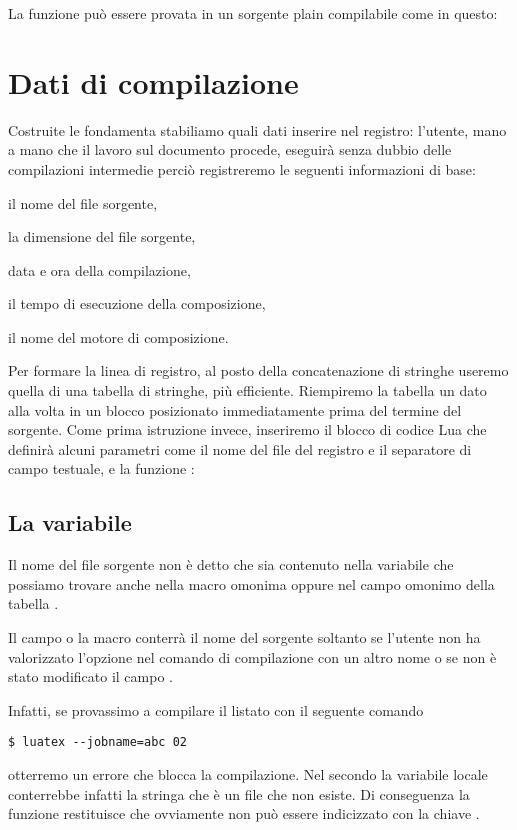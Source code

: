 La funzione  può essere provata in un sorgente plain \LuaTeX{}
compilabile come in questo:


\section{Dati di compilazione}

Costruite le fondamenta stabiliamo quali dati inserire nel registro: l'utente,
mano a mano che il lavoro sul documento procede, eseguirà senza dubbio delle
compilazioni intermedie perciò registreremo le seguenti informazioni di base:
\begin{compactenumerate}
\item il nome del file sorgente,
\item la dimensione del file sorgente,
\item data e ora della compilazione,
\item il tempo di esecuzione della composizione,
\item il nome del motore di composizione.
\end{compactenumerate}

Per formare la linea di registro, al posto della concatenazione di stringhe
useremo quella di una tabella di stringhe, più efficiente. Riempiremo la tabella
un dato alla volta in un blocco  posizionato immediatamente prima
del termine del sorgente. Come prima istruzione invece, inseriremo il blocco di
codice Lua che definirà alcuni parametri come il nome del file del registro e il
separatore di campo testuale, e la funzione :


\subsection{La variabile }

Il nome del file sorgente non è detto che sia contenuto nella variabile
 che possiamo trovare anche nella macro omonima oppure nel campo
omonimo della tabella .

Il campo o la macro conterrà il nome del sorgente soltanto se l'utente non ha
valorizzato l'opzione  nel comando di compilazione con un altro
nome o se non è stato modificato il campo .

Infatti, se provassimo a compilare il listato  con il seguente
comando
\begin{Verbatim}[numbers=none,xleftmargin=0pt]
$ luatex --jobname=abc 02
\end{Verbatim}
otterremo un errore che blocca la compilazione. Nel secondo  la
variabile locale  conterrebbe infatti la stringa 
che è un file che non esiste. Di conseguenza la funzione 
restituisce  che ovviamente non può essere indicizzato con la chiave
.

